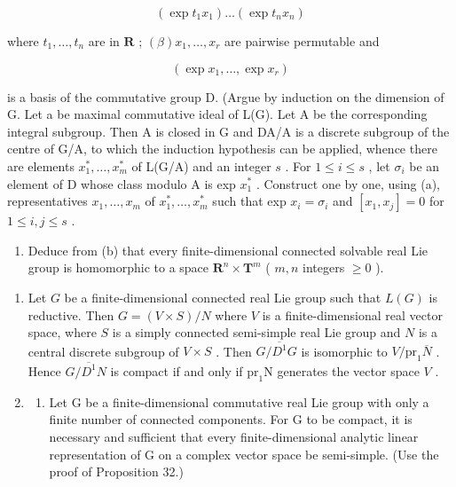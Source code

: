 \[
\left(\exp t _ {1} x _ {1}\right) \dots \left(\exp t _ {n} x _ {n}\right)
\]

where \(t_1, \ldots, t_n\) are in \(\mathbf{R}\) ; \((\beta)x_1, \ldots, x_r\) are pairwise permutable and

\[
(\exp x _ {1}, \dots , \exp x _ {r})
\]

is a basis of the commutative group D. (Argue by induction on the dimension of G. Let a be maximal commutative ideal of L(G). Let A be the corresponding integral subgroup. Then A is closed in G and DA/A is a discrete subgroup of the centre of G/A, to which the induction hypothesis can be applied, whence there are elements \(x_1^*, \ldots, x_m^*\) of L(G/A) and an integer \(s\) . For \(1 \leqslant i \leqslant s\) , let \(\sigma_i\) be an element of D whose class modulo A is exp \(x_1^*\) . Construct one by one, using (a), representatives \(x_1, \ldots, x_m\) of \(x_1^*, \ldots, x_m^*\) such that exp \(x_i = \sigma_i\) and \([x_1, x_j] = 0\) for \(1 \leqslant i, j \leqslant s\) .

\begin{enumerate}
\def\labelenumi{(\alph{enumi})}
\setcounter{enumi}{2}
\tightlist
\item
  Deduce from (b) that every finite-dimensional connected solvable real Lie group is homomorphic to a space \(\mathbf{R}^n\times \mathbf{T}^m\) ( \(m,n\) integers \(\geqslant 0\) ).
\end{enumerate}

\begin{enumerate}
\def\labelenumi{\arabic{enumi}.}
\setcounter{enumi}{21}
\item
  Let \(G\) be a finite-dimensional connected real Lie group such that \(L(G)\) is reductive. Then \(G = (V \times S)/N\) where \(V\) is a finite-dimensional real vector space, where \(S\) is a simply connected semi-simple real Lie group and \(N\) is a central discrete subgroup of \(V \times S\) . Then \(G/\overline{D^1}G\) is isomorphic to \(V/\mathrm{pr}_1\overline{N}\) . Hence \(G/\overline{D^1}N\) is compact if and only if \(\mathrm{pr}_1\mathrm{N}\) generates the vector space \(V\) .
\item
  \begin{enumerate}
  \def\labelenumii{(\alph{enumii})}
  \tightlist
  \item
    Let G be a finite-dimensional commutative real Lie group with only a finite number of connected components. For G to be compact, it is necessary and sufficient that every finite-dimensional analytic linear representation of G on a complex vector space be semi-simple. (Use the proof of Proposition 32.)
  \end{enumerate}
\end{enumerate}

